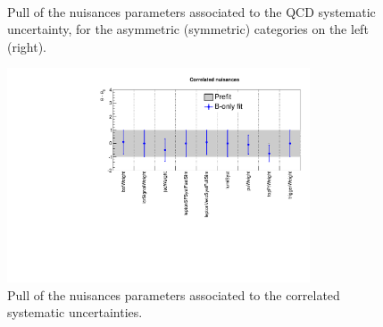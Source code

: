 \begin{figure}[tbhp]
    \caption{ Pull of the nuisances parameters associated to the QCD systematic uncertainty, 
      for the asymmetric (symmetric) categories on the left (right).
      \label{fig:nuisPull_qcd}}
  \begin{center}
     ~~
  \end{center}
\end{figure}


\begin{figure}[tbhp]
    \caption{ Pull of the nuisances parameters associated to the correlated systematic uncertainties. 
      \label{fig:nuisPull_Correlated}}
  \begin{center}
    \includegraphics[width=0.8\textwidth]{figures/postFitResults/nuisancePlots/Correlated_nuisances}
  \end{center}
\end{figure}


